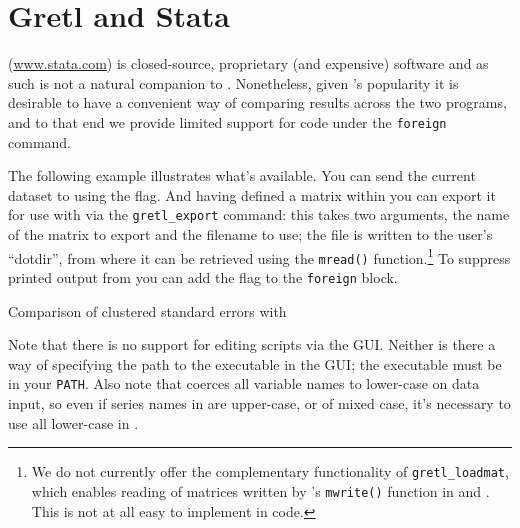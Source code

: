 \chapter{Gretl and Stata}
\label{chap:gretlStata}

 (\url{www.stata.com}) is closed-source, proprietary (and
expensive) software and as such is not a natural companion to
. Nonetheless, given 's popularity it is
desirable to have a convenient way of comparing results across the two
programs, and to that end we provide limited support for 
code under the \texttt{foreign} command.

The following example illustrates what's available. You can send the
current  dataset to  using the
 flag. And having defined a matrix within
 you can export it for use with  via the
\verb|gretl_export| command: this takes two arguments, the name of the
matrix to export and the filename to use; the file is written to the
user's ``dotdir'', from where it can be retrieved using the
\texttt{mread()} function.\footnote{We do not currently offer the
  complementary functionality of \verb|gretl_loadmat|, which enables
  reading of matrices written by 's \texttt{mwrite()}
  function in  and . This is not at all easy to
  implement in  code.} To suppress printed output
from  you can add the  flag to the
\texttt{foreign} block.


\begin{script}[htbp]
  \caption{Comparison of clustered standard errors with }
\label{Stata-test}
\end{script}

Note that there is no support for editing  scripts via the
 GUI. Neither is there a way of specifying the path to the
 executable in the  GUI; the executable must be
in your \texttt{PATH}. Also note that  coerces all variable
names to lower-case on data input, so even if series names in
 are upper-case, or of mixed case, it's necessary to use
all lower-case in . 


